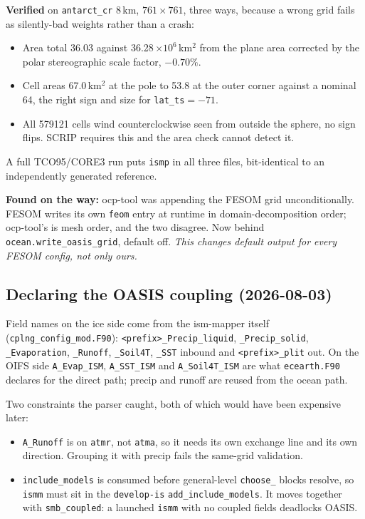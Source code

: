 \documentclass[11pt,a4paper]{article}
\newcommand{\code}[1]{\texttt{\small #1}}
\begin{document}
\medskip\noindent
\textbf{Verified} on \code{antarct\_cr} 8\,km, $761\times761$, three ways, because a wrong grid
fails as silently-bad weights rather than a crash:
\begin{itemize}
\item Area total 36.03 against 36.28\,$\times10^6$\,km$^2$ from the plane area corrected by the
      polar stereographic scale factor, $-0.70\%$.
\item Cell areas 67.0\,km$^2$ at the pole to 53.8 at the outer corner against a nominal 64, the
      right sign and size for \code{lat\_ts}$=-71$.
\item All 579121 cells wind counterclockwise seen from outside the sphere, no sign flips. SCRIP
      requires this and the area check cannot detect it.
\end{itemize}
A full TCO95/CORE3 run puts \code{ismp} in all three files, bit-identical to an independently
generated reference.

\medskip\noindent
\textbf{Found on the way:} ocp-tool was appending the FESOM grid unconditionally. FESOM writes its
own \code{feom} entry at runtime in domain-decomposition order; ocp-tool's is mesh order, and the
two disagree. Now behind \code{ocean.write\_oasis\_grid}, default off. \emph{This changes default
output for every FESOM config, not only ours.}

\subsection{Declaring the OASIS coupling (2026-08-03)}

Field names on the ice side come from the ism-mapper itself
(\code{cplng\_config\_mod.F90}): \code{<prefix>\_Precip\_liquid}, \code{\_Precip\_solid},
\code{\_Evaporation}, \code{\_Runoff}, \code{\_Soil4T}, \code{\_SST} inbound and
\code{<prefix>\_plit} out. On the OIFS side \code{A\_Evap\_ISM}, \code{A\_SST\_ISM} and
\code{A\_Soil4T\_ISM} are what \code{ecearth.F90} declares for the direct path; precip and runoff
are reused from the ocean path.

Two constraints the parser caught, both of which would have been expensive later:
\begin{itemize}
\item \code{A\_Runoff} is on \code{atmr}, not \code{atma}, so it needs its own exchange line and
      its own direction. Grouping it with precip fails the same-grid validation.
\item \code{include\_models} is consumed before general-level \code{choose\_} blocks resolve, so
      \code{ismm} must sit in the \code{develop-is} \code{add\_include\_models}. It moves together
      with \code{smb\_coupled}: a launched \code{ismm} with no coupled fields deadlocks OASIS.
\end{itemize}
\end{document}
